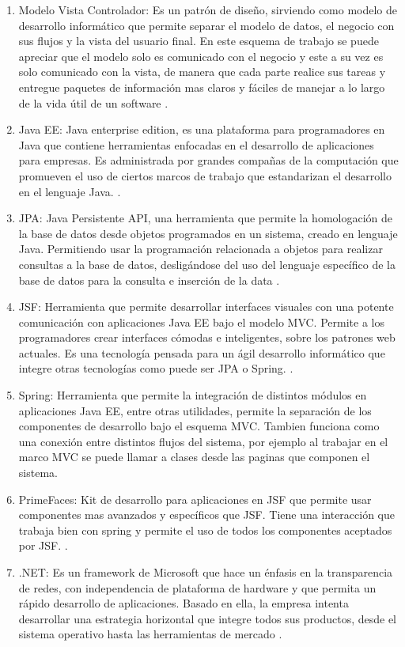 \documentclass[a4paper,12pt,openany,oneside]{book}
\begin{document}
\begin{enumerate}
	    \item Modelo Vista Controlador: Es un patrón de diseño, sirviendo como modelo de desarrollo informático que permite separar el modelo de datos, el negocio con sus flujos y la vista del usuario final. En este esquema de trabajo se puede apreciar que el modelo solo es comunicado con el negocio y este a su vez es solo comunicado con la vista, de manera que cada parte realice sus tareas y entregue paquetes de información mas claros y fáciles de manejar a lo largo de la vida útil de un software \cite{data12}.
	\item Java EE: Java enterprise edition, es una plataforma para programadores en Java que contiene herramientas enfocadas en el desarrollo de aplicaciones para empresas. Es administrada por grandes compañas de la computación que promueven el uso de ciertos marcos de trabajo que estandarizan el desarrollo en el lenguaje Java. \cite{data14}.
	\item JPA: Java Persistente API, una herramienta que permite la homologación de la base de datos desde objetos programados en un sistema, creado en lenguaje Java. Permitiendo usar la programación relacionada a objetos para realizar consultas a la base de datos, desligándose del uso del lenguaje específico de la base de datos para la consulta e inserción de la data \cite{data13}.
	\item JSF: Herramienta que permite desarrollar interfaces visuales con una potente comunicación con aplicaciones Java EE bajo el modelo MVC. Permite a los programadores crear interfaces cómodas e inteligentes, sobre los patrones web actuales. Es una tecnología pensada para un ágil desarrollo informático que integre otras tecnologías como puede ser JPA o Spring. \cite{data16}.
	\item Spring: Herramienta que permite la integración de distintos módulos en aplicaciones Java EE, entre otras utilidades, permite la separación de los componentes de desarrollo bajo el esquema MVC. Tambien funciona como una conexión entre distintos flujos del sistema, por ejemplo al trabajar en el marco MVC se puede llamar a clases desde las paginas que componen el sistema\cite{data15}.
	\item PrimeFaces: Kit de desarrollo para aplicaciones en JSF que permite usar componentes mas avanzados y específicos que JSF. Tiene una interacción que trabaja bien con spring y permite el uso de todos los componentes aceptados por JSF. \cite{data17}.
	\item .NET: Es un framework de Microsoft que hace un énfasis en la transparencia de redes, con independencia de plataforma de hardware y que permita un rápido desarrollo de aplicaciones. Basado en ella, la empresa intenta desarrollar una estrategia horizontal que integre todos sus productos, desde el sistema operativo hasta las herramientas de mercado \cite{data8}.

\end{enumerate}
\end{document}
